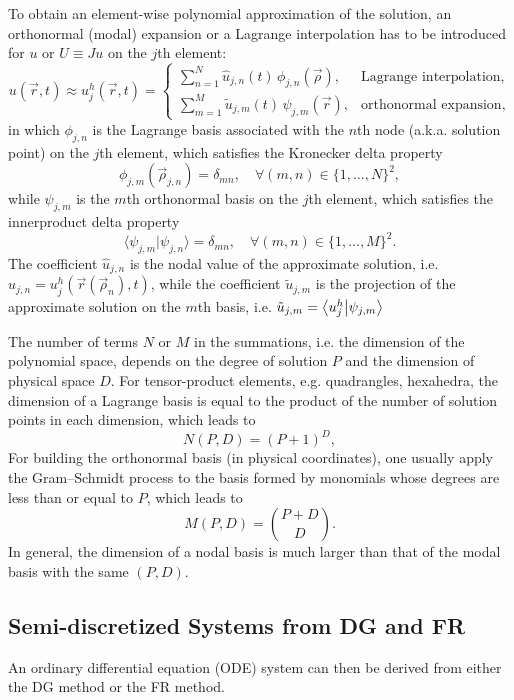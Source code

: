 \documentclass[10pt,draft]{article}
\begin{document}
To obtain an element-wise polynomial approximation of the solution, an orthonormal (modal) expansion or a Lagrange interpolation has to be introduced for $u$ or $U\equiv Ju$ on the $j$th element:
$$
u(\vec{r},t)\approx u_{j}^{h}(\vec{r},t)=\begin{cases}
\sum_{n=1}^{N}\hat{u}_{j,n}(t)\,\phi_{j,n}(\vec{\rho}), & \text{Lagrange interpolation},\\
\sum_{m=1}^{M}\tilde{u}_{j,m}(t)\,\psi_{j,m}(\vec{r}), & \text{orthonormal expansion},
\end{cases}
$$
in which $\phi_{j,n}$ is the Lagrange basis associated with the $n$th node (a.k.a. solution point) on the $j$th element, which satisfies the Kronecker delta property
$$
\phi_{j,m}(\vec{\rho}_{j,n})=\delta_{mn},\quad\forall (m,n)\in\{1,\dots,N\}^2,
$$
while $\psi_{j,m}$ is the $m$th orthonormal basis on the $j$th element, which satisfies the innerproduct delta property
$$
\langle\psi_{j,m}\vert\psi_{j,n}\rangle=\delta_{mn},\quad\forall (m,n)\in\{1,\dots,M\}^2.
$$
%
The coefficient $\hat{u}_{j,n}$ is the nodal value of the approximate solution, i.e. $\hat{u}_{j,n}=u_j^h(\vec{r}(\vec{\rho}_n), t)$,
while the coefficient $\tilde{u}_{j,m}$ is the projection of the approximate solution on the $m$th basis, i.e. $\tilde{u}_{j,m}=\ip{u_j^h}{\psi_{j,m}}$

The number of terms $N$ or $M$ in the summations, i.e. the dimension of the polynomial space, depends on the degree of solution $P$ and the dimension of physical space $D$.
%
For tensor-product elements, e.g. quadrangles, hexahedra, the dimension of a Lagrange basis is equal to the product of the number of solution points in each dimension, which leads to
$$
N(P,D)=(P+1)^D,
$$
%
For building the orthonormal basis (in physical coordinates), one usually apply the Gram--Schmidt process to the basis formed by monomials whose degrees are less than or equal to $P$, which leads to
$$
M(P,D)=\binom{P+D}{D}.
$$
%
In general, the dimension of a nodal basis is much larger than that of the modal basis with the same $(P,D)$.

\subsection{Semi-discretized Systems from DG and FR}
An ordinary differential equation (ODE) system can then be derived from either the DG method or the FR method.
%
\end{document}
